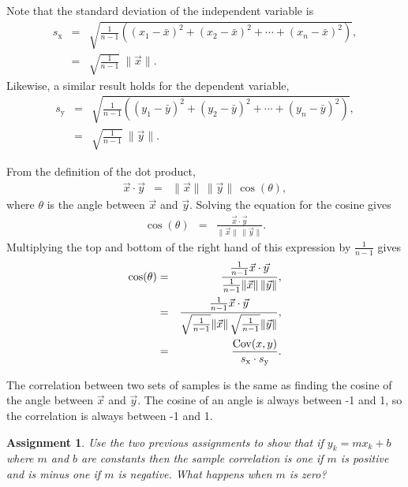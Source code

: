 \documentclass[12pt]{article}
\newtheorem{assignment}{Assignment}[section]
\newcommand{\lp}{\left(}
\newcommand{\rp}{\right)}
\begin{document}
Note that the standard deviation of the independent variable is
\begin{eqnarray*}
  s_{\mathrm x} & = & \sqrt{ \frac{1}{n-1} 
  \lp (x_1-\bar{x})^2 + (x_2-\bar{x})^2 + \cdots + (x_n-\bar{x})^2 \rp} , \\
  & = & \sqrt{\frac{1}{n-1}} ~ \| \vec{x} \|.
\end{eqnarray*}
Likewise, a similar result holds for the dependent variable,
\begin{eqnarray*}
  s_{\mathrm y} & = & \sqrt{ \frac{1}{n-1} 
  \lp (y_1-\bar{y})^2 + (y_2-\bar{y})^2 + \cdots + (y_n-\bar{y})^2 \rp} , \\
  & = & \sqrt{\frac{1}{n-1}} ~ \| \vec{y} \|.
\end{eqnarray*}

From the definition of the dot product,
\begin{eqnarray*}
  \vec{x}\cdot\vec{y} & = & \|\vec{x}\| \, \|\vec{y}\| \, \cos(\theta),
\end{eqnarray*}
where $\theta$ is the angle between $\vec{x}$ and $\vec{y}$. Solving
the equation for the cosine gives
\begin{eqnarray*}
  \cos(\theta) & = & \frac{\vec{x}\cdot\vec{y}}{\|\vec{x}\| \, \|\vec{y}\|}.
\end{eqnarray*}
Multiplying the top and bottom of the right hand of this expression by
$\frac{1}{n-1}$ gives
\begin{eqnarray*}
    \cos(\theta) & = & \frac{\frac{1}{n-1}\vec{x}\cdot\vec{y}}{
      \frac{1}{n-1} \|\vec{x}\| \, \|\vec{y}\|}, \\
    & = & \frac{\frac{1}{n-1}\vec{x}\cdot\vec{y}}{
      \sqrt{\frac{1}{n-1}} \|\vec{x}\| \, \sqrt{\frac{1}{n-1}} \|\vec{y}\|}, \\
    & = & \frac{\mathrm{Cov}(x,y)}{s_{\rm x} \cdot s_{\rm y}}.
\end{eqnarray*}

The correlation between two sets of samples is the same as finding the
cosine of the angle between $\vec{x}$ and $\vec{y}$. The cosine of an
angle is always between -1 and 1, so the correlation is always between
-1 and 1.

\fi

\begin{assignment}
  Use the two previous assignments to show that if $y_k=m x_k+b$ where
  $m$ and $b$ are constants then the sample correlation is one if $m$
  is positive and is minus one if $m$ is negative. What happens when
  $m$ is zero?
\end{assignment}
\end{document}
